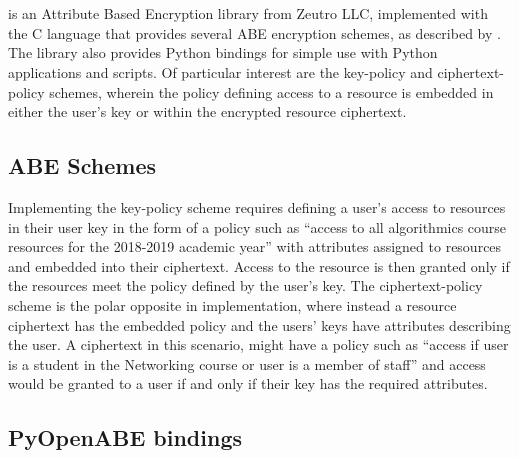 \section{\OpenABE}
\label{sec:bkgr_openabe}

\OpenABE is an Attribute Based Encryption library from Zeutro LLC, implemented with the C language that provides several ABE encryption schemes, as described by \citet{Akinyele2011}. The library also provides Python bindings for simple use with Python applications and scripts. Of particular interest are the key-policy and ciphertext-policy schemes, wherein the policy defining access to a resource is embedded in either the user's key or within the encrypted resource ciphertext.

\subsection{ABE Schemes}
\label{subsec:bkgr_openabe_schemes}

Implementing the key-policy scheme requires defining a user's access to resources in their user key in the form of a policy such as ``access to all algorithmics course resources for the 2018-2019 academic year'' with attributes assigned to resources and embedded into their ciphertext. Access to the resource is then granted only if the resources meet the policy defined by the user's key. The ciphertext-policy scheme is the polar opposite in implementation, where instead a resource ciphertext has the embedded policy and the users' keys have attributes describing the user. A ciphertext in this scenario, might have a policy such as ``access if user is a student in the Networking course or user is a member of staff'' and access would be granted to a user if and only if their key has the required attributes.

\subsection{PyOpenABE bindings}
\label{subsec:bkgr_pyopenabe}

